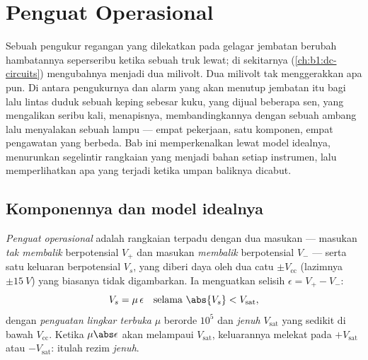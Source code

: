 \chapter{Penguat Operasional}\label{ch:b1:operational-amplifier}

Sebuah pengukur regangan yang dilekatkan pada gelagar jembatan berubah
hambatannya seperseribu ketika sebuah truk lewat;  di
sekitarnya (\cref{ch:b1:dc-circuits}) mengubahnya menjadi dua milivolt.
Dua milivolt tak menggerakkan apa pun. Di antara pengukurnya dan alarm
yang akan menutup jembatan itu bagi lalu lintas duduk sebuah keping
sebesar kuku, yang dijual beberapa sen, yang mengalikan 
seribu kali, menapisnya, membandingkannya dengan sebuah ambang lalu
menyalakan sebuah lampu --- empat pekerjaan, satu komponen, empat
pengawatan yang berbeda. Bab ini memperkenalkan 
lewat model idealnya, menurunkan segelintir rangkaian yang menjadi bahan
setiap instrumen, lalu memperlihatkan apa yang terjadi ketika umpan
baliknya dicabut.

\section{Komponennya dan model idealnya}

\begin{definition}\label{def:b1:operational-amplifier:opamp}
\emph{Penguat operasional} adalah rangkaian terpadu dengan dua masukan
--- masukan \emph{tak membalik} berpotensial $V_+$ dan masukan
\emph{membalik} berpotensial $V_-$ --- serta satu keluaran
berpotensial $V_s$, yang diberi daya oleh dua catu $\pm V_{\mathrm{cc}}$
(lazimnya $\pm\qty{15}{V}$) yang biasanya tidak digambarkan. Ia
menguatkan selisih $\epsilon = V_+ - V_-$:
\[
V_s = \mu\,\epsilon \quad\text{selama } \abs{V_s} < V_{\mathrm{sat}},
\]
dengan \emph{penguatan lingkar terbuka} $\mu$ berorde $10^5$ dan
\emph{ jenuh} $V_{\mathrm{sat}}$ yang sedikit di bawah
$V_{\mathrm{cc}}$. Ketika $\mu\abs\epsilon$ akan melampaui
$V_{\mathrm{sat}}$, keluarannya melekat pada $+V_{\mathrm{sat}}$ atau
$-V_{\mathrm{sat}}$: itulah rezim \emph{jenuh}.
\end{definition}

